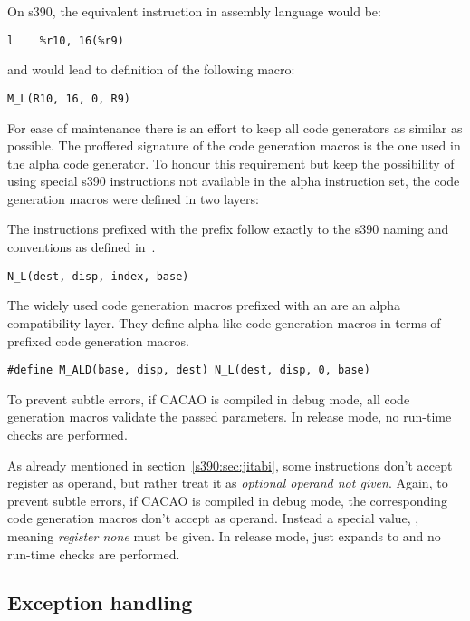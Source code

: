 On s390, the equivalent instruction in assembly language would be:

\begin{verbatim}
l    %r10, 16(%r9)
\end{verbatim}

and would lead to definition of the following macro:

\begin{verbatim}
M_L(R10, 16, 0, R9)
\end{verbatim}

For ease of maintenance there is an effort to keep all code generators as similar as possible. The proffered signature of the code generation macros is the one used in the alpha code generator. To honour this requirement but keep the possibility of using special s390 instructions not available in the alpha instruction set, the code generation macros were defined in two layers:

The instructions prefixed with the prefix  follow exactly to the s390 naming and conventions as defined in~\cite{s390:bib:principles}.

\begin{verbatim}
N_L(dest, disp, index, base)
\end{verbatim}

The widely used code generation macros prefixed with an  are an alpha compatibility layer. They define alpha-like code generation macros in terms of  prefixed code generation macros.

\begin{verbatim}
#define M_ALD(base, disp, dest) N_L(dest, disp, 0, base)
\end{verbatim}

To prevent subtle errors, if CACAO is compiled in debug mode, all code generation macros validate the passed parameters. In release mode, no run-time checks are performed. 

As already mentioned in section~\ref{s390:sec:jitabi}, some instructions don't accept register  as operand, but rather treat it as \emph{optional operand not given}. Again, to prevent subtle errors, if CACAO is compiled in debug mode, the corresponding code generation macros don't accept  as operand. Instead a special value, , meaning \emph{register none} must be given. In release mode,  just expands to  and no run-time checks are performed.

\subsection{Exception handling}

